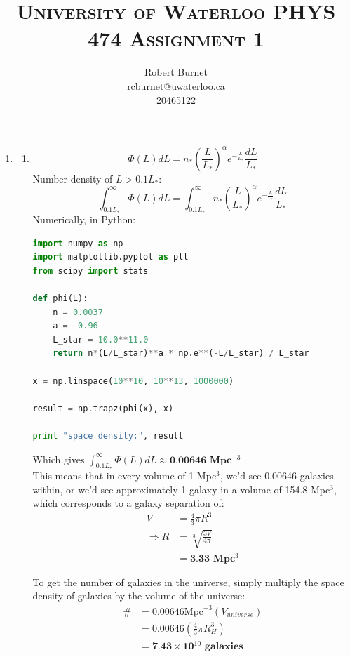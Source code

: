 \documentclass[10pt,letterpaper]{article}
\begin{document}
\title{\scshape\LARGE University of Waterloo \vfill \huge\bfseries PHYS 474 Assignment 1 \vfill}
\author{Robert Burnet \\ rcburnet@uwaterloo.ca \\ 20465122 }
\maketitle

\newpage
\begin{enumerate}
\item \begin{enumerate}
\item \begin{equation}\nonumber
\Phi (L) dL = n_* \left(\frac{L}{L_*}\right)^\alpha e^{-\frac{L}{L_*}} \frac{dL}{L_*}
\end{equation}
Number density of $L > 0.1 L_*$:
\begin{equation}\nonumber
\int_{0.1L_*}^{\infty} \Phi (L) dL = \int_{0.1L_*}^{\infty} n_* \left(\frac{L}{L_*}\right)^\alpha e^{-\frac{L}{L_*}} \frac{dL}{L_*}
\end{equation}
Numerically, in Python:
\begin{lstlisting}[language=Python]
import numpy as np
import matplotlib.pyplot as plt
from scipy import stats

def phi(L):
    n = 0.0037
    a = -0.96
    L_star = 10.0**11.0
    return n*(L/L_star)**a * np.e**(-L/L_star) / L_star

x = np.linspace(10**10, 10**13, 1000000)

result = np.trapz(phi(x), x)

print "space density:", result
\end{lstlisting}
Which gives $\int_{0.1L_*}^{\infty} \Phi (L) dL \approx \textbf{0.00646  Mpc$^{-3}$}$\\

This means that in every volume of 1 Mpc$^3$, we'd see 0.00646 galaxies within, or we'd see approximately 1 galaxy in a volume of 154.8 Mpc$^3$, which corresponds to a galaxy separation of:
\begin{equation}\nonumber
\begin{split}
V & =  \frac{4}{3} \pi R^3 \\
\Rightarrow R & = \sqrt[3]{\frac{3V}{4\pi}} \\
& = \textbf{3.33 Mpc$^3$}
\end{split}
\end{equation}

To get the number of galaxies in the universe, simply multiply the space density of galaxies by the volume of the universe:
\begin{equation}\nonumber
\begin{split}
\# & = 0.00646\text{Mpc}^{-3} (V_{universe})\\
 & = 0.00646 \left(\frac{4}{3} \pi R_H^3\right)\\
 & = \textbf{7.43$\times$10$^{10}$ galaxies}
\end{split}
\end{equation}


\end{enumerate}
\end{enumerate}
\end{document}
